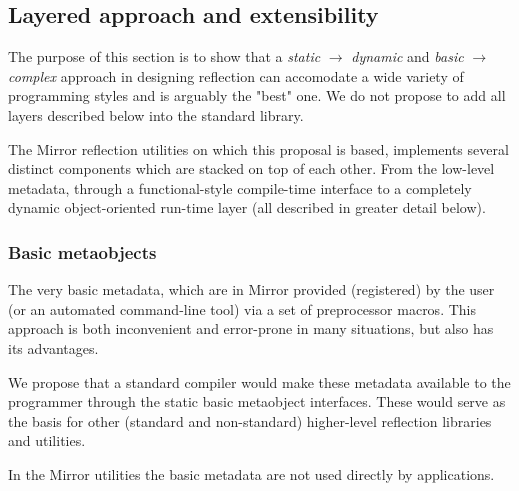\subsection{Layered approach and extensibility}

The purpose of this section is to show that a {\em static} $\to$ {\em dynamic}
and {\em basic} $\to$ {\em complex} approach in designing reflection
can accomodate a wide variety of programming styles and is arguably
the "best" one. We do not propose to add all layers described
below into the standard library.

The Mirror reflection utilities \cite{mirror-doc-cpp11} on which this
proposal is based, implements several distinct components which
are stacked on top of each other. From the low-level metadata, through
a functional-style compile-time interface to a completely dynamic
object-oriented run-time layer (all described in greater detail below).

\subsubsection{Basic metaobjects}
The very basic metadata, which are in Mirror
provided (registered) by the user (or an automated command-line tool) via a set
of preprocessor macros. This approach is both inconvenient and error-prone
in many situations, but also has its advantages.

We propose that a standard compiler would make these metadata available
to the programmer through the static basic metaobject interfaces. These would
serve as the basis for other (standard and non-standard) higher-level
reflection libraries and utilities.

In the Mirror utilities the basic metadata are not used directly by
applications.



